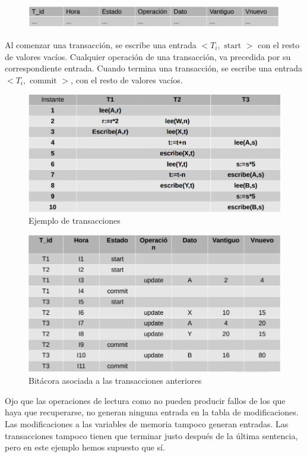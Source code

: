 \begin{figure}[H]
  \center
  \includegraphics[scale=0.45]{img/19.png}
\end{figure}

Al comenzar una transacción, se escribe una entrada $<T_i,\text{ start }>$ con el resto de valores vacíos. Cualquier operación de una transacción, va precedida por su correspondiente entrada. Cuando termina una transacción, se escribe una entrada $<T_i, \text{ commit }>$, con el resto de valores vacíos.

\begin{figure}[H]
  \center
  \includegraphics[scale=0.45]{img/20.png}
  \caption{Ejemplo de transacciones}
\end{figure}

\begin{figure}[H]
  \center
  \includegraphics[scale=0.45]{img/21.png}
  \caption{Bitácora asociada a las transacciones anteriores}
\end{figure}

Ojo que las operaciones de lectura como no pueden producir fallos de los que haya que recuperarse, no generan ninguna entrada en la tabla de modificaciones. Las modificaciones a las variables de memoria tampoco generan entradas. Las transacciones tampoco tienen que terminar justo después de la última sentencia, pero en este ejemplo hemos supuesto que sí.

